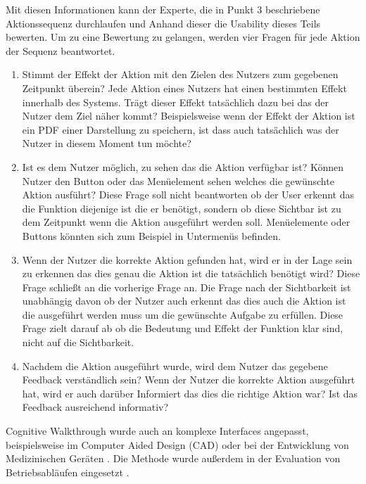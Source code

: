 \documentclass[draft=false
              ,paper=a4
              ,twoside=false
              ,fontsize=11pt
              ,headsepline
              ,BCOR10mm
              ,DIV11
              ]{scrbook}
\begin{document}
Mit diesen Informationen kann der Experte, die in Punkt 3 beschriebene Aktionssequenz durchlaufen und Anhand dieser die Usability dieses Teils bewerten. Um zu eine Bewertung zu gelangen, werden vier Fragen für jede Aktion der Sequenz beantwortet.

\begin{enumerate}
  \item Stimmt der Effekt der Aktion mit den Zielen des Nutzers zum gegebenen Zeitpunkt überein? Jede Aktion eines Nutzers hat einen bestimmten Effekt innerhalb des Systems. Trägt dieser Effekt tatsächlich dazu bei das der Nutzer dem Ziel näher kommt? Beispielsweise wenn der Effekt der Aktion ist ein PDF einer Darstellung zu speichern, ist dass auch tatsächlich was der Nutzer in diesem Moment tun möchte?
  \item Ist es dem Nutzer möglich, zu sehen das die Aktion verfügbar ist? Können Nutzer den Button oder das Menüelement sehen welches die gewünschte Aktion ausführt? Diese Frage soll nicht beantworten ob der User erkennt das die Funktion diejenige ist die er benötigt, sondern ob diese Sichtbar ist zu dem Zeitpunkt wenn die Aktion ausgeführt werden soll. Menüelemente oder Buttons könnten sich zum Beispiel in Untermenüs befinden.
  \item Wenn der Nutzer die korrekte Aktion gefunden hat, wird er in der Lage sein zu erkennen das dies genau die Aktion ist die tatsächlich benötigt wird? Diese Frage schließt an die vorherige Frage an. Die Frage nach der Sichtbarkeit ist unabhängig davon ob der Nutzer auch erkennt das dies auch die Aktion ist die ausgeführt werden muss um die gewünschte Aufgabe zu erfüllen. Diese Frage zielt darauf ab ob die Bedeutung und Effekt der Funktion klar sind, nicht auf die Sichtbarkeit.
  \item Nachdem die Aktion ausgeführt wurde, wird dem Nutzer das gegebene Feedback verständlich sein? Wenn der Nutzer die korrekte Aktion ausgeführt hat, wird er auch darüber Informiert das dies die richtige Aktion war? Ist das Feedback ausreichend informativ? 
\end{enumerate}

Cognitive Walkthrough wurde auch an komplexe Interfaces angepasst, beispielsweise im Computer Aided Design (CAD) \cite{wharton_applying_1992} oder bei der Entwicklung von Medizinischen Geräten \cite{bliga_ard_enhanced_2013}. Die Methode wurde außerdem in der Evaluation von Betriebsabläufen eingesetzt \cite{novick_using_1999}.
\end{document}

